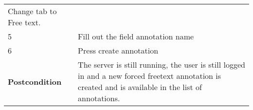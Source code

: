 \begin{longtable}[c]{@{}ll@{}}
\begin{minipage}[t]{0.63\columnwidth}\raggedright\strut
Change tab to Free text.
\strut\end{minipage}\tabularnewline
\begin{minipage}[t]{0.31\columnwidth}\raggedright\strut
5
\strut\end{minipage} &
\begin{minipage}[t]{0.63\columnwidth}\raggedright\strut
Fill out the field annotation name
\strut\end{minipage}\tabularnewline
\begin{minipage}[t]{0.31\columnwidth}\raggedright\strut
6
\strut\end{minipage} &
\begin{minipage}[t]{0.63\columnwidth}\raggedright\strut
Press create annotation
\strut\end{minipage}\tabularnewline
\begin{minipage}[t]{0.31\columnwidth}\raggedright\strut
\textbf{Postcondition}
\strut\end{minipage} &
\begin{minipage}[t]{0.63\columnwidth}\raggedright\strut
The server is still running, the user is still logged in and a new
forced freetext annotation is created and is available in the list of
annotations.
\strut\end{minipage}\tabularnewline
\bottomrule
\end{longtable}

